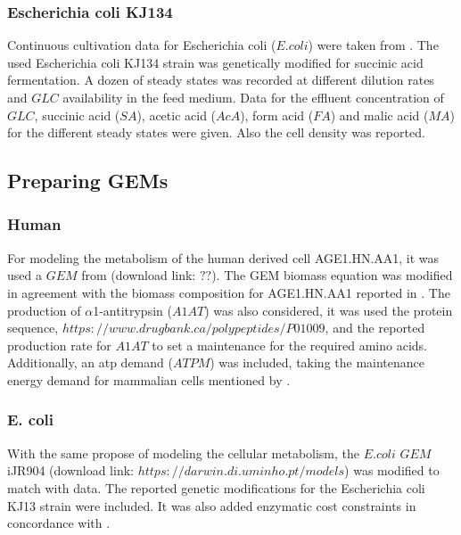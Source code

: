 \documentclass[]{article}
\begin{document}
	
	\subsubsection{Escherichia coli KJ134} 
	Continuous cultivation data for Escherichia coli ($E. coli$) were taken from . The used Escherichia coli KJ134 strain was genetically modified for succinic acid fermentation. A dozen of steady states was recorded at different dilution rates and $GLC$ availability in the feed medium. Data for the effluent concentration of $GLC$, succinic acid ($SA$), acetic acid ($AcA$), form acid ($FA$) and malic acid ($MA$) for the different steady states were given. Also the cell density was reported.
	
	\subsection{Preparing GEMs} 
	
	\subsubsection{Human}
	For modeling the metabolism of the human derived cell AGE1.HN.AA1, it was used a $GEM$ from (download link: $??$). The GEM biomass equation was modified in agreement with the  biomass composition for AGE1.HN.AA1 reported in . The production of $\alpha$1-antitrypsin ($A1AT$) was also considered, it was used the protein sequence, $https://www.drugbank.ca/polypeptides/P01009$, and the reported production rate for $A1AT$  to set a maintenance for the required amino acids. Additionally, an atp demand ($ATPM$) was included, taking the maintenance energy demand for mammalian cells mentioned by  .
	
	\subsubsection{E. coli}
	With the same propose of modeling the cellular metabolism, the $E. coli$ $GEM$ iJR904  (download link: $https://darwin.di.uminho.pt/models$) was modified to match with  data. The reported genetic modifications for the Escherichia coli KJ13 strain were included. It was also added enzymatic cost constraints in concordance with .
	
\end{document}
